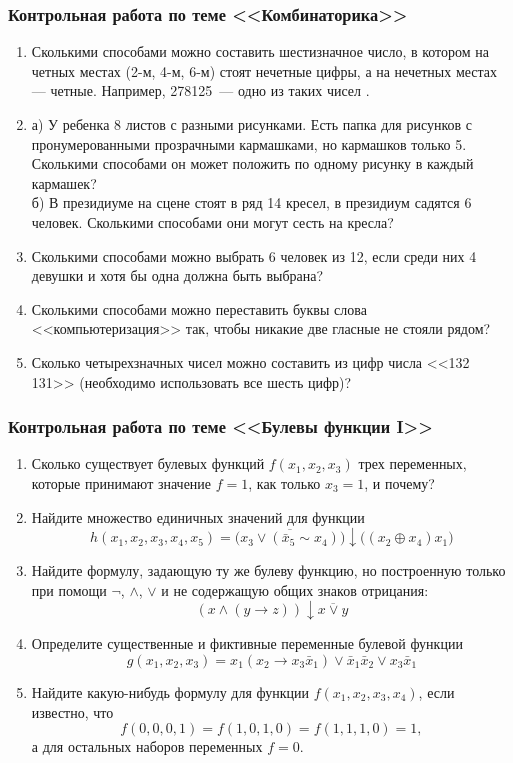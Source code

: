 \documentclass{rpd}
\begin{document}
        
    \subsubsection*{Контрольная работа по теме <<Комбинаторика>>}

        \begin{enumerate}
        \item
        Сколькими способами можно составить шестизначное число, в котором на четных местах (2-м, 4-м, 6-м) стоят нечетные цифры, а на нечетных местах — четные. Например, 278125~--- одно из таких чисел .
        \item
        а) У ребенка 8 листов с разными рисунками. Есть папка для рисунков с пронумерованными прозрачными кармашками, но кармашков только 5. Сколькими способами он может положить по одному рисунку в каждый кармашек?\\
        б) В президиуме на сцене стоят в ряд 14 кресел, в президиум садятся 6 человек. Сколькими способами они могут сесть на кресла?
        \item
        Сколькими способами можно выбрать 6 человек из 12, если среди них 4 девушки и хотя бы одна должна быть выбрана?
        \item
        Сколькими способами можно переставить буквы слова <<компьютеризация>> так, чтобы никакие две гласные не стояли рядом?
        \item
        Сколько четырехзначных чисел можно составить из цифр числа <<132 131>> (необходимо использовать все шесть цифр)?
        \end{enumerate}
                
    \subsubsection*{Контрольная работа по теме <<Булевы функции I>>}
        \begin{enumerate}
        \item
        Сколько существует булевых функций $f(x_1,x_2,x_3)$ трех
        переменных, которые принимают значение $f=1$, как только $x_3=1$, и почему?
        \item
        Найдите множество единичных значений для функции
        \[
        h(x_1,x_2,x_3,x_4,x_5)= \overline{\bigl(x_3\vee (\bar{x}_5 \sim x_4)\bigr)} \downarrow \bigl((x_2\oplus x_4)x_1\bigr)
        \]
        \item
        Найдите формулу, задающую ту же булеву функцию, но 
        построенную только при помощи $\neg$, $\wedge$, $\vee$
        и не содержащую общих знаков отрицания:
        \[(x \wedge (y \to z)) \downarrow \overline{x \vee y}\]
        \item
        Определите существенные и фиктивные переменные булевой функции
        \[g(x_1,x_2,x_3)=x_1(x_2 \to x_3\bar{x}_1) \vee \bar{x}_1\bar{x}_2 \vee  x_3\bar{x}_1\]
        \item
        Найдите какую-нибудь формулу для функции $f(x_1,x_2,x_3,x_4)$, если известно, что 
        \[f(0,0,0,1) =  f(1,0,1,0) = f(1,1,1,0) = 1,\] 
        а для остальных наборов переменных $f = 0$.
        \end{enumerate}
\end{document}
